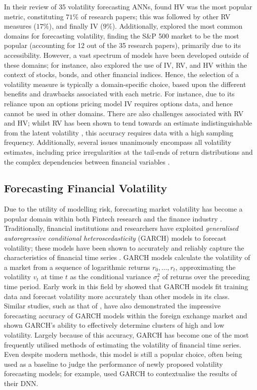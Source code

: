 \documentclass[a4paper, 11pt]{report}
\begin{document}
    In their review of 35 volatility forecasting ANNs, \citet{ge-2022} found HV was the most popular metric, constituting $71\%$ of research papers; this was followed by other RV measures ($17\%$), and finally IV ($9\%$). Additionally, \citet{ge-2022} explored the most common domains for forecasting volatility, finding the S\&P 500 market to be the most popular (accounting for 12 out of the 35 research papers), primarily due to its accessibility. However, a vast spectrum of models have been developed outside of these domains; for instance, \citet{ge-2022} also explored the use of IV, RV, and HV within the context of stocks, bonds, and other financial indices. Hence, the selection of a volatility measure is typically a domain-specific choice, based upon the different benefits and drawbacks associated with each metric. For instance, due to its reliance upon an options pricing model IV requires options data, and hence cannot be used in other domains. There are also challenges associated with RV and HV; whilst RV has been shown to tend towards an estimate indistinguishable from the latent volatility \citep{andersen-2001}, this accuracy requires data with a high sampling frequency. Additionally, several issues unanimously encompass all volatility estimates, including price irregularities at the tail-ends of return distributions \citep{ozbayoglu-2020} and the complex dependencies between financial variables \citep{timmermann-2004}.


    \subsection{Forecasting Financial Volatility}

    Due to the utility of modelling risk, forecasting market volatility has become a popular domain within both Fintech research \citep{ozbayoglu-2020} and the finance industry \citep{chartis-2019}. Traditionally, financial institutions and researchers have exploited \emph{generalised autoregressive conditional heteroscedasticity} (GARCH) models to forecast volatility; these models have been shown to accurately and reliably capture the characteristics of financial time series \citep{lahmiri-2017}. GARCH models calculate the volatility of a market from a sequence of logarithmic returns $r_0, \dots, r_t$, approximating the volatility $v_t$ at time $t$ as the conditional variance $\sigma_{t}^2$ of returns over the preceding time period. Early work in this field by \citet{akgiray-1989} showed that GARCH models fit training data and forecast volatility more accurately than other models in its class. Similar studies, such as that of \citet{hansen-2005}, have also demonstrated the impressive forecasting accuracy of GARCH models within the foreign exchange market and shown GARCH's ability to effectively determine clusters of high and low volatility. Largely because of this accuracy, GARCH has become one of the most frequently utilised methods of estimating the volatility of financial time series. Even despite modern methods, this model is still a popular choice, often being used as a baseline to judge the performance of newly proposed volatility forecasting models; for example, \citet{rodikov-2022} used GARCH to contextualise the results of their DNN.
\end{document}
